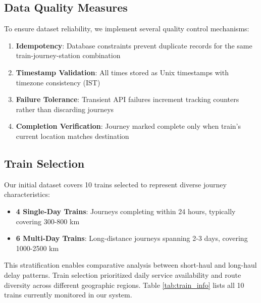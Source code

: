 \documentclass[11pt,a4paper]{article}
\begin{document}
\subsection{Data Quality Measures}

To ensure dataset reliability, we implement several quality control mechanisms:

\begin{enumerate}
    \item \textbf{Idempotency}: Database constraints prevent duplicate records for the same train-journey-station combination
    \item \textbf{Timestamp Validation}: All times stored as Unix timestamps with timezone consistency (IST)
    \item \textbf{Failure Tolerance}: Transient API failures increment tracking counters rather than discarding journeys
    \item \textbf{Completion Verification}: Journey marked complete only when train's current location matches destination
\end{enumerate}

\subsection{Train Selection}

Our initial dataset covers 10 trains selected to represent diverse journey characteristics:

\begin{itemize}
    \item \textbf{4 Single-Day Trains}: Journeys completing within 24 hours, typically covering 300-800 km
    \item \textbf{6 Multi-Day Trains}: Long-distance journeys spanning 2-3 days, covering 1000-2500 km
\end{itemize}

This stratification enables comparative analysis between short-haul and long-haul delay patterns. Train selection prioritized daily service availability and route diversity across different geographic regions. Table \ref{tab:train_info} lists all 10 trains currently monitored in our system.
\end{document}
